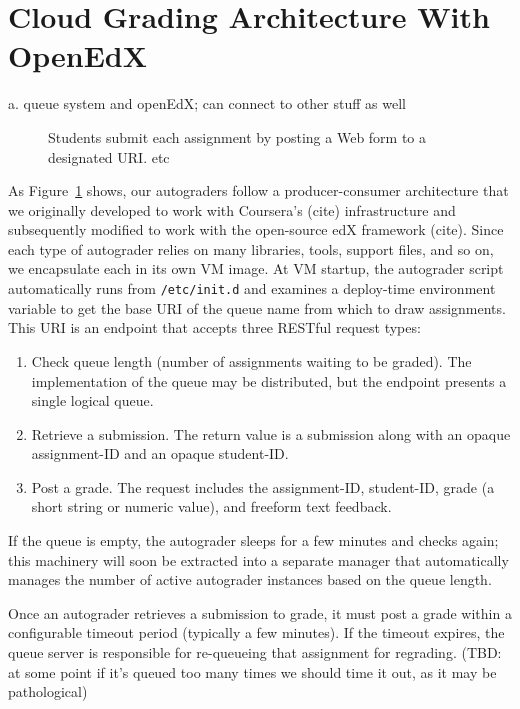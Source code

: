 \section{Cloud Grading Architecture With OpenEdX}



a.	queue system and openEdX; can connect to other stuff as well


\begin{figure}
  \caption{\label{fig:arch}
  Students submit each assignment by posting a Web form to a designated
  URI.  etc}

\end{figure}

As Figure~\ref{fig:arch} shows, 
our autograders follow a producer-consumer architecture that we
originally developed to work with Coursera's (cite) infrastructure and
subsequently modified to work with the open-source edX framework (cite).
Since each type of autograder relies on many libraries,
tools, support files, and so on, we encapsulate each in its own VM image.
At VM startup, the autograder script automatically runs from
\texttt{/etc/init.d} and examines a deploy-time environment variable
to get the base URI of the queue name from which to draw assignments.  
This URI is an endpoint that accepts three RESTful request types:

\begin{enumerate}
\item Check queue length (number of assignments waiting to be graded).
  The implementation of the queue may be distributed, but the endpoint
  presents a single logical queue.
\item Retrieve a submission.  The return value is a submission along
  with an opaque assignment-ID and an opaque student-ID.
\item Post a grade.  The request includes the assignment-ID, student-ID,
  grade (a short string or numeric value), and freeform text feedback.
\end{enumerate}

If the queue is empty, the autograder sleeps for a few minutes and checks
again; this machinery will soon be extracted into a separate manager
that automatically manages the number of active autograder instances
based on the queue length.

Once an autograder retrieves a submission to grade, it must post a grade
within a configurable timeout period (typically a few minutes).
If the timeout expires, the queue server is responsible for re-queueing
that assignment for regrading.  (TBD: at some point if it's queued too
many times we should time it out, as it may be pathological)

